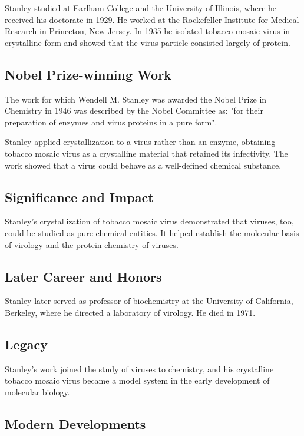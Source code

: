 Stanley studied at Earlham College and the University of Illinois, where he received his doctorate in 1929. He worked at the Rockefeller Institute for Medical Research in Princeton, New Jersey. In 1935 he isolated tobacco mosaic virus in crystalline form and showed that the virus particle consisted largely of protein.

\subsection*{Nobel Prize-winning Work}

The work for which Wendell M. Stanley was awarded the Nobel Prize in Chemistry in 1946 was described by the Nobel Committee as: "for their preparation of enzymes and virus proteins in a pure form".

Stanley applied crystallization to a virus rather than an enzyme, obtaining tobacco mosaic virus as a crystalline material that retained its infectivity. The work showed that a virus could behave as a well-defined chemical substance.

\subsection*{Significance and Impact}

Stanley's crystallization of tobacco mosaic virus demonstrated that viruses, too, could be studied as pure chemical entities. It helped establish the molecular basis of virology and the protein chemistry of viruses.

\subsection*{Later Career and Honors}

Stanley later served as professor of biochemistry at the University of California, Berkeley, where he directed a laboratory of virology. He died in 1971.

\subsection*{Legacy}

Stanley's work joined the study of viruses to chemistry, and his crystalline tobacco mosaic virus became a model system in the early development of molecular biology.

\subsection*{Modern Developments}

